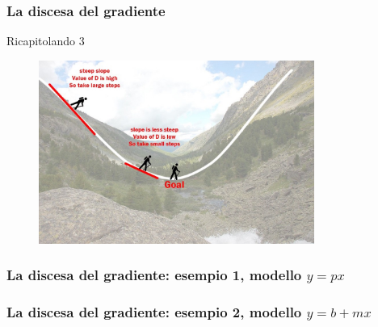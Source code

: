 \begin{frame}

	\frametitle{La discesa del gradiente}

	\begin{block}{Ricapitolando 3}
		\begin{figure}[!htbp]
			\centering
			\includegraphics[height=6cm]{images/supervised/training_reducing_loss/gradient_descent_mountain_walk.jpeg}
		\end{figure}

	\end{block}

\end{frame}


\begin{frame}

	\frametitle{La discesa del gradiente: esempio 1, modello $y=px$}

		\centering

\end{frame}


\begin{frame}

	\frametitle{La discesa del gradiente: esempio 2, modello $y=b+mx$}

		\centering

\end{frame}


